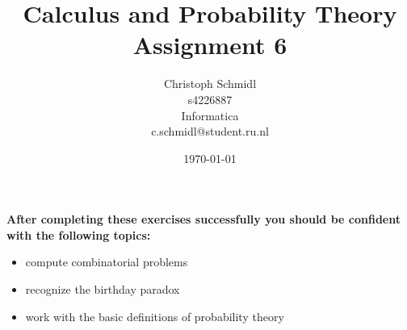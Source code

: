 \documentclass[a4paper]{article}
\title{Calculus and Probability Theory\\ Assignment 6}
\author{Christoph Schmidl\\
s4226887\\
Informatica\\
c.schmidl@student.ru.nl\\}
\date{\today}
\begin{document}
\maketitle





\textbf{After completing these exercises successfully you should be confident with the following topics:}

\begin{itemize}
	\item compute combinatorial problems
	\item recognize the birthday paradox
	\item work with the basic definitions of probability theory
\end{itemize}
\vspace{1em}
\end{document}
